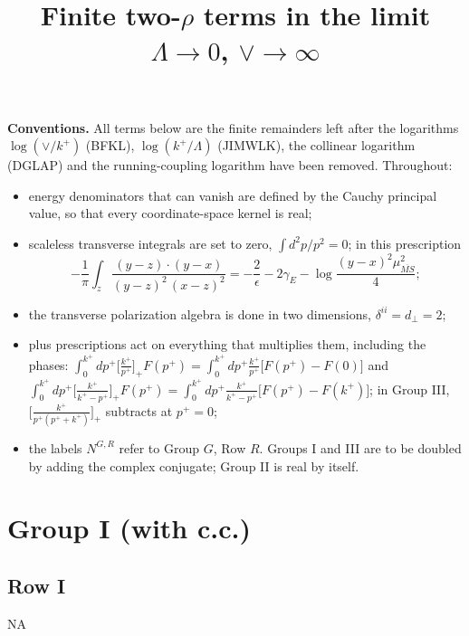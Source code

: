 \documentclass[9pt]{article}
\title{Finite two-$\rho$ terms in the limit $\Lambda\to 0$, $\vee\to \infty$}
\author{}
\date{}
\numberwithin{equation}{section}
\begin{document}
\maketitle
\noindent\textbf{Conventions.} All terms below are the finite remainders left after the logarithms $\log(\vee/k^{+})$ (BFKL), $\log(k^{+}/\Lambda)$ (JIMWLK), the collinear logarithm (DGLAP) and the running-coupling logarithm have been removed. Throughout:
\begin{itemize}
\item energy denominators that can vanish are defined by the Cauchy principal value, so that every coordinate-space kernel is real;
\item scaleless transverse integrals are set to zero, $\int d^{2}p/p^{2}=0$; in this prescription
\begin{equation}
-\frac{1}{\pi}\int_{z}\frac{(y-z)\cdot(y-x)}{(y-z)^{2}\,(x-z)^{2}}=-\frac{2}{\epsilon}-2\gamma_{E}-\log\frac{(y-x)^{2}\mu^{2}_{\overline{MS}}}{4};\label{eq:Lid}
\end{equation}
\item the transverse polarization algebra is done in two dimensions, $\delta^{ii}=d_{\perp}=2$;
\item plus prescriptions act on everything that multiplies them, including the phases:
$\int_{0}^{k^{+}}dp^{+}\big[\tfrac{k^{+}}{p^{+}}\big]_{+}F(p^{+})=\int_{0}^{k^{+}}dp^{+}\tfrac{k^{+}}{p^{+}}\big[F(p^{+})-F(0)\big]$ and
$\int_{0}^{k^{+}}dp^{+}\big[\tfrac{k^{+}}{k^{+}-p^{+}}\big]_{+}F(p^{+})=\int_{0}^{k^{+}}dp^{+}\tfrac{k^{+}}{k^{+}-p^{+}}\big[F(p^{+})-F(k^{+})\big]$;
in Group III, $\big[\tfrac{k^{+}}{p^{+}(p^{+}+k^{+})}\big]_{+}$ subtracts at $p^{+}=0$;
\item the labels $N^{G,R}$ refer to Group $G$, Row $R$. Groups I and III are to be doubled by adding the complex conjugate; Group II is real by itself.
\end{itemize}
\section{Group I (with c.c.)}
\subsection{Row I}
\textsc{NA}
\end{document}
